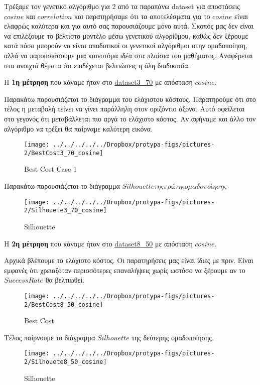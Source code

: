  Τρέξαμε τον γενετικό αλγόριθμο για 2 από τα παραπάνω dataset για αποστάσεις $cosine$ και $correlation$ και παρατηρήσαμε ότι τα αποτελέσματα για το $cosine$ είναι ελαφρώς καλύτερα και για αυτό σας παρουσιάζουμε μόνο αυτά. Σκοπός μας δεν είναι να επιλέξουμε το βέλτιστο μοντέλο μέσω γενετικού αλγορίθμου, καθώς δεν ξέρουμε κατά πόσο μπορούν να είναι αποδοτικοί οι γενετικοί αλγόριθμοι στην ομαδοποίηση, αλλά να παρουσιάσουμε μια καινοτόμα ιδέα στα πλαίσια του μαθήματος. Αναφέρεται στα ανοιχτά θέματα ότι επιδέχεται βελτιώσεις η όλη διαδικασία.
 
 Η \textbf{1η μέτρηση} που κάναμε ήταν στο \url{dataset3_70} με απόσταση $cosine$.
 
 Παρακάτω παρουσιάζεται το διάγραμμα του ελάχιστου κόστους. Παρατηρούμε ότι στο τέλος η μεταβολή τείνει να γίνει παράλληλη στον οριζόντιο άξονα. Αυτό οφείλεται στο γεγονός ότι μεταβάλλεται πιο αργά το ελάχιστο κόστος. Αν αφήναμε και άλλο τον αλγόριθμο να τρέξει θα παίρναμε καλύτερη εικόνα.
 

   \begin{figure}
   	\centering
   	\texttt{[image: ../../../../../Dropbox/protypa-figs/pictures-2/BestCost3\_70\_cosine]}
   	\caption{Best Cost Case 1 }
   	\label{fig:Besto Cost}
   \end{figure}
   
   Παρακάτω παρουσιάζεται το διάγραμμα $Silhouette της πρώτης ομαδοποίησης$
   
     \begin{figure}
     	\centering
     \texttt{[image: ../../../../../Dropbox/protypa-figs/pictures-2/Silhouete3\_70\_cosine]}
     	\caption{Silhouette }
     	\label{fig:Silhouette}
     \end{figure}
   
   
   Η \textbf{2η μέτρηση} που κάναμε ήταν στο \url{dataset8_50} με απόσταση $cosine$.
   
   Αρχικά βλέπουμε το ελάχιστο κόστος. Οι παρατηρήσεις μας είναι ίδιες με πριν. Είναι εμφανές ότι χρειαζόταν περισσότερες επαναλήψεις χωρίς ωστόσο να ξέρουμε αν το $Success Rate$ θα βελτιωθεί.
   
   
   
   \begin{figure}
   	\centering
   \texttt{[image: ../../../../../Dropbox/protypa-figs/pictures-2/BestCost8\_50\_cosine]}
   	\caption{Best Cost }
   	\label{fig:Best Cost}
   \end{figure}
   
   Τέλος παίρνουμε το διάγραμμα $Silhouette$ της δεύτερης ομαδοποίησης.
   \begin{figure}
   	\centering
   \texttt{[image: ../../../../../Dropbox/protypa-figs/pictures-2/Silhouete8\_50\_cosine]}
   	\caption{Silhouette }
   	\label{fig:Silhouette}
   \end{figure}
 

